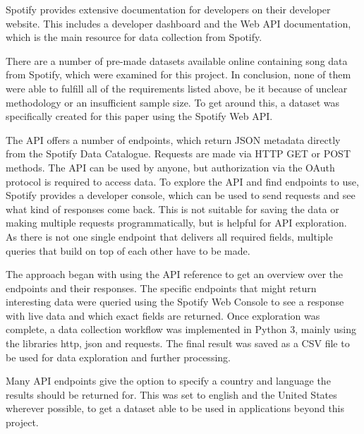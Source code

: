 Spotify provides extensive documentation for developers on their developer website.\cite{SpotifyDev}
This includes a developer dashboard and the Web API documentation, which is the main resource
for data collection from Spotify.

There are a number of pre-made datasets available online containing song data from Spotify,
which were examined for this project. In conclusion, none of them were able to fulfill
all of the requirements listed above, be it because of unclear methodology or an insufficient sample size.
To get around this, a dataset was specifically created for this paper using the Spotify Web API.

The \ac{API} offers a number of endpoints, which return \ac{JSON} metadata
directly from the Spotify Data Catalogue\cite{SpotifyWebAPI}.
Requests are made via HTTP GET or POST methods.
The \ac{API} can be used by anyone, but authorization via the OAuth protocol is required to access data.
To explore the \ac{API} and find endpoints to use, Spotify provides a developer console, which can be used to 
send requests and see what kind of responses come back. This is not suitable for saving the data or making multiple
requests programmatically, but is helpful for API exploration. As there is not one single endpoint that delivers all
required fields, multiple queries that build on top of each other have to be made.

The approach began with using the \ac{API} reference to get an overview over the endpoints and their responses.
The specific endpoints that might return interesting data were queried using the Spotify Web Console to see
a response with live data and which exact fields are returned.
Once exploration was complete, a data collection workflow was implemented in Python 3, mainly using the
libraries http, json and requests. The final result was saved as a CSV file to be used for data exploration
and further processing.

Many API endpoints give the option to specify a country and language the results should be returned for.
This was set to english and the United States wherever possible, to get a dataset able to be used
in applications beyond this project.

